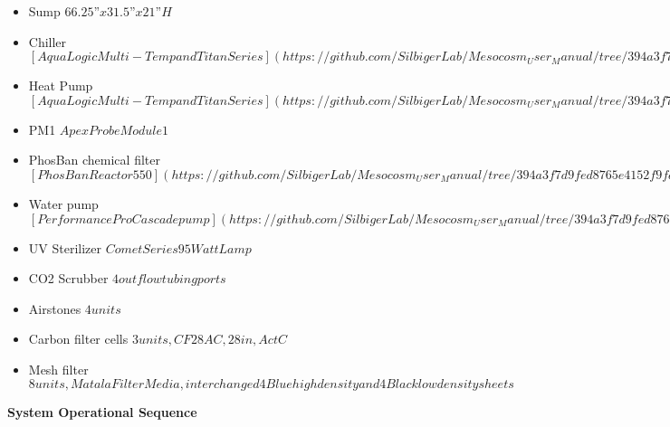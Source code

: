 \documentclass[]{book}
\providecommand{\tightlist}{%
  \setlength{\itemsep}{0pt}\setlength{\parskip}{0pt}}
\begin{document}
\begin{itemize}
\tightlist
\item
  Sump \(66.25” x 31.5” x 21”H\)\\
\item
  Chiller
  \([AquaLogic Multi-Temp and Titan Series](https://github.com/SilbigerLab/Mesocosm_User_Manual/tree/394a3f7d9fed8765e4152f9fdd11d00a2ea87a93/Manuals/AquaLogic_Chiller.pdf)\)\\
\item
  Heat Pump
  \([AquaLogic Multi-Temp and Titan Series](https://github.com/SilbigerLab/Mesocosm_User_Manual/tree/394a3f7d9fed8765e4152f9fdd11d00a2ea87a93/Manuals/AquaLogic_Chiller.pdf)\)\\
\item
  PM1 \(Apex Probe Module 1\)\\
\item
  PhosBan chemical filter
  \([PhosBan Reactor 550](https://github.com/SilbigerLab/Mesocosm_User_Manual/tree/394a3f7d9fed8765e4152f9fdd11d00a2ea87a93/Manuals/Phosban_Reactor.pdf)\)\\
\item
  Water pump
  \([PerformancePro Cascade pump](https://github.com/SilbigerLab/Mesocosm_User_Manual/tree/394a3f7d9fed8765e4152f9fdd11d00a2ea87a93/Manuals/Complete_Cascade.pdf)\)\\
\item
  UV Sterilizer \(Comet Series 95 Watt Lamp\)\\
\item
  CO2 Scrubber \(4 outflow tubing ports\)
\item
  Airstones \(4 units\)\\
\item
  Carbon filter cells \(3 units, CF28AC,28in, ActC\)\\
\item
  Mesh filter
  \(8 units, Matala Filter Media, interchanged 4 Blue high density and 4 Black low density sheets\)
\end{itemize}

\textbf{System Operational Sequence}
\end{document}
